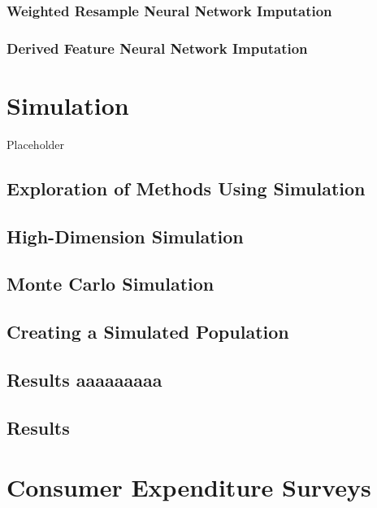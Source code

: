 \documentclass[12pt,twoside]{reedthesis}
\begin{document}
\subsection{Weighted Resample Neural Network
Imputation}\label{weighted-resample-neural-network-imputation}

\subsection{Derived Feature Neural Network
Imputation}\label{derived-feature-neural-network-imputation}

\chapter{Simulation}\label{simulation}

Placeholder

\section{Exploration of Methods Using
Simulation}\label{exploration-of-methods-using-simulation}

\section{High-Dimension Simulation}\label{high-dimension-simulation}

\section{Monte Carlo Simulation}\label{monte-carlo-simulation}

\section{Creating a Simulated
Population}\label{creating-a-simulated-population}

\section{Results aaaaaaaaa}\label{results-aaaaaaaaa}

\section{Results}\label{results}

\chapter{Consumer Expenditure
Surveys}\label{consumer-expenditure-surveys}
\end{document}
